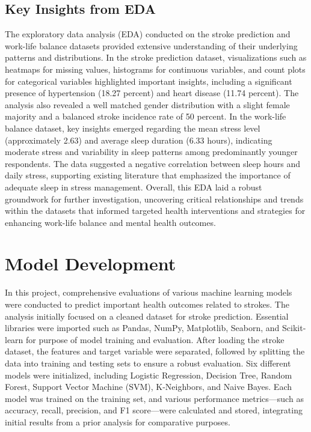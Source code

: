 \documentclass[runningheads]{llncs}
\begin{document}
\begin{enumerate}
\subsection{Key Insights from EDA}
The exploratory data analysis (EDA) conducted on the stroke prediction and work-life balance datasets provided extensive understanding of their underlying patterns and distributions. In the stroke prediction dataset, visualizations such as heatmaps for missing values, histograms for continuous variables, and count plots for categorical variables highlighted important insights, including a significant presence of hypertension (18.27 percent) and heart disease (11.74 percent). The analysis also revealed a well matched gender distribution with a slight female majority and a balanced stroke incidence rate of 50 percent. In the work-life balance dataset, key insights emerged regarding the mean stress level (approximately 2.63) and average sleep duration (6.33 hours), indicating moderate stress and variability in sleep patterns among predominantly younger respondents. The data suggested a negative correlation between sleep hours and daily stress, supporting existing literature that emphasized the importance of adequate sleep in stress management. Overall, this EDA laid a robust groundwork for further investigation, uncovering critical relationships and trends within the datasets that informed targeted health interventions and strategies for enhancing work-life balance and mental health outcomes.

\section{Model Development}
In this project, comprehensive evaluations of various machine learning models were conducted to predict important health outcomes related to strokes. The analysis initially focused on a cleaned dataset for stroke prediction. Essential libraries were imported such as Pandas, NumPy, Matplotlib, Seaborn, and Scikit-learn for purpose of model training and evaluation. After loading the stroke dataset, the features and target variable were separated, followed by splitting the data into training and testing sets to ensure a robust evaluation. Six different models were initialized, including Logistic Regression, Decision Tree, Random Forest, Support Vector Machine (SVM), K-Neighbors, and Naive Bayes. Each model was trained on the training set, and various performance metrics—such as accuracy, recall, precision, and F1 score—were calculated and stored, integrating initial results from a prior analysis for comparative purposes.


\end{enumerate}
\end{document}
